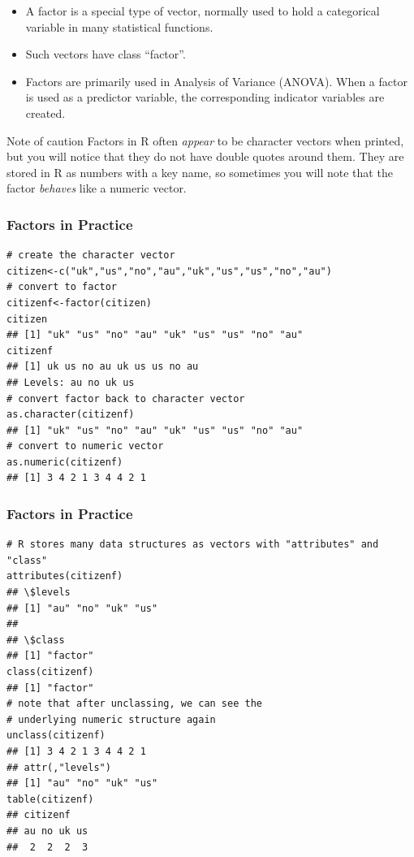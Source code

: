 \documentclass[]{article}
\theoremstyle{definition}
\theoremstyle{definition}
\theoremstyle{remark}
\begin{document}
\begin{itemize}
\item
  {A factor is a special type of vector, normally used to hold a
  categorical variable in many statistical functions.}
\item
  {Such vectors have class ``factor''.}
\item
  {Factors are primarily used in Analysis of Variance (ANOVA). When a
  factor is used as a predictor variable, the corresponding indicator
  variables are created.}
\end{itemize}

{Note of caution} Factors in R often \emph{appear} to be character
vectors when printed, but you will notice that they do not have double
quotes around them. They are stored in R as numbers with a key name, so
sometimes you will note that the factor \emph{behaves} like a numeric
vector.

\subsubsection{Factors in Practice}\label{factors-in-practice}

\begin{verbatim}
# create the character vector
citizen<-c("uk","us","no","au","uk","us","us","no","au") 
# convert to factor
citizenf<-factor(citizen)                                
citizen             
## [1] "uk" "us" "no" "au" "uk" "us" "us" "no" "au"
citizenf
## [1] uk us no au uk us us no au
## Levels: au no uk us
# convert factor back to character vector
as.character(citizenf)
## [1] "uk" "us" "no" "au" "uk" "us" "us" "no" "au"
# convert to numeric vector
as.numeric(citizenf)
## [1] 3 4 2 1 3 4 4 2 1
\end{verbatim}

\subsubsection{Factors in Practice}\label{factors-in-practice-1}

\begin{verbatim}
# R stores many data structures as vectors with "attributes" and "class"
attributes(citizenf)
## \$levels
## [1] "au" "no" "uk" "us"
## 
## \$class
## [1] "factor"
class(citizenf)
## [1] "factor"
# note that after unclassing, we can see the 
# underlying numeric structure again
unclass(citizenf)
## [1] 3 4 2 1 3 4 4 2 1
## attr(,"levels")
## [1] "au" "no" "uk" "us"
table(citizenf)
## citizenf
## au no uk us 
##  2  2  2  3
\end{verbatim}
\end{document}
